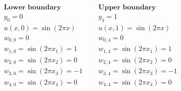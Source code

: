 \[
\begin{array}{lcl}
\textbf{Lower boundary}&\ \ \ & \textbf{Upper boundary}\\ 
 y_0=0&\ \ \ & y_4=1 \\
 u(x,0)=\sin(2\pi x)&\ \ \ & u(x,1)=\sin(2\pi x) \\

 w_{0,0}=0 & \ \ \ & w_{0,4}=0\\ 

w_{1,0}=\sin(2\pi x_1) =1  & \ \ \ & w_{1,4}=\sin(2\pi x_1) =1 \\


w_{2,0}=\sin(2\pi x_2) =0  & \ \ \ & w_{2,4}=\sin(2\pi x_2) =0 \\


w_{3,0}=\sin(2\pi x_3) =-1  & \ \ \ & w_{3,4}=\sin(2\pi x_3) =-1 \\


w_{4,0}=\sin(2\pi x_4) =0  & \ \ \ & w_{4,4}=\sin(2\pi x_4) =0 \\

\end{array}
\]

